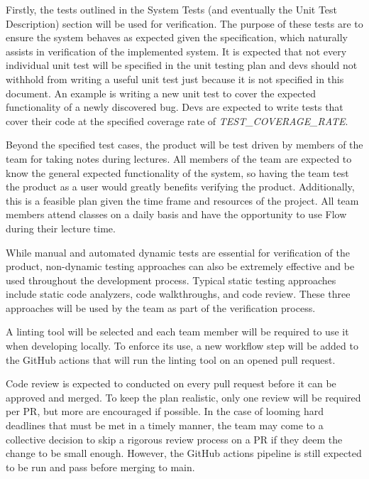 \documentclass[12pt, titlepage]{article}
\begin{document}

Firstly, the tests outlined in the System Tests (and eventually the Unit Test
Description) section will be used for verification. The purpose of these tests
are to ensure the system behaves as expected given the specification, which
naturally assists in verification of the implemented system. It is expected
that not every individual unit test will be specified in the unit testing plan
and devs should not withhold from writing a useful unit test just because it is
not specified in this document. An example is writing a new unit test to cover
the expected functionality of a newly discovered bug. Devs are expected to
write tests that cover their code at the specified coverage rate of
\textit{TEST\_COVERAGE\_RATE}.

Beyond the specified test cases, the product will be test driven by members
of the team for taking notes during lectures. All members of the team are
expected to know the general expected functionality of the system, so having
the team test the product as a user would greatly benefits verifying the
product. Additionally, this is a feasible plan given the time frame and
resources of the project. All team members attend classes on a daily basis and
have the opportunity to use Flow during their lecture time.

While manual and automated dynamic tests are essential for verification of the
product, non-dynamic testing approaches can also be extremely effective and be
used throughout the development process. Typical static testing approaches
include static code analyzers, code walkthroughs, and code review. These three
approaches will be used by the team as part of the verification process.

A linting tool will be selected and each team member will be required to use it
when developing locally. To enforce its use, a new workflow step will be added
to the GitHub actions that will run the linting tool on an opened pull request.

Code review is expected to conducted on every pull request before it can be
approved and merged. To keep the plan realistic, only one review will be
required per PR, but more are encouraged if possible. In the case of looming
hard deadlines that must be met in a timely manner, the team may come to a
collective decision to skip a rigorous review process on a PR if they deem the
change to be small enough. However, the GitHub actions pipeline is still
expected to be run and pass before merging to main.
\end{document}
